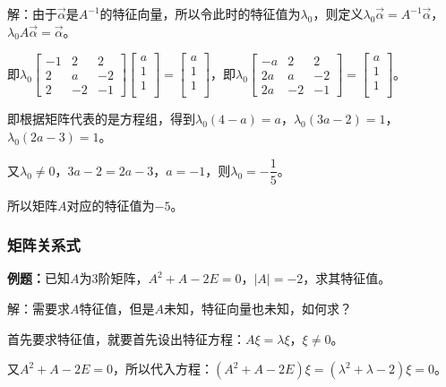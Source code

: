 解：由于$\overrightarrow{\alpha}$是$A^{-1}$的特征向量，所以令此时的特征值为$\lambda_0$，则定义$\lambda_0\overrightarrow{\alpha}=A^{-1}\overrightarrow{\alpha}$，$\lambda_0A\overrightarrow{\alpha}=\overrightarrow{\alpha}$。

即$\lambda_0\left[\begin{array}{ccc}
    -1 & 2 & 2 \\
    2 & a & -2 \\
    2 & -2 & -1
\end{array}\right]\left[\begin{array}{c}
    a \\
    1 \\
    1 \\
\end{array}\right]=\left[\begin{array}{c}
    a \\
    1 \\
    1 \\
\end{array}\right]$，即$\lambda_0\left[\begin{array}{ccc}
    -a & 2 & 2 \\
    2a & a & -2 \\
    2a & -2 & -1
\end{array}\right]=\left[\begin{array}{c}
    a \\
    1 \\
    1 \\
\end{array}\right]$。\medskip

即根据矩阵代表的是方程组，得到$\lambda_0(4-a)=a$，$\lambda_0(3a-2)=1$，$\lambda_0(2a-3)=1$。

又$\lambda_0\neq0$，$3a-2=2a-3$，$a=-1$，则$\lambda_0=-\dfrac{1}{5}$。

所以矩阵$A$对应的特征值为$-5$。

\subsubsection{矩阵关系式}

\textbf{例题：}已知$A$为3阶矩阵，$A^2+A-2E=0$，$\vert A\vert=-2$，求其特征值。

解：需要求$A$特征值，但是$A$未知，特征向量也未知，如何求？

首先要求特征值，就要首先设出特征方程：$A\xi=\lambda\xi$，$\xi\neq0$。

又$A^2+A-2E=0$，所以代入方程：$(A^2+A-2E)\xi=(\lambda^2+\lambda-2)\xi=0$。

